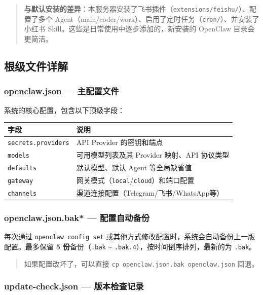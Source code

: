 \begin{quote}
\textbf{与默认安装的差异}：本服务器安装了飞书插件（\texttt{extensions/feishu/}）、配置了多个 Agent（main/coder/work）、启用了定时任务（\texttt{cron/}）、并安装了小红书 Skill。这些是日常使用中逐步添加的，新安装的 OpenClaw 目录会更简洁。
\end{quote}

\subsection{根级文件详解}


\subsubsection{openclaw.json --- 主配置文件}


系统的核心配置，包含以下顶级字段：

\begin{table}[h]
\centering
\small
\begin{tabular}{|l|p{}|}
\hline
字段 & 说明 \\
\hline
\texttt{secrets.providers} & API Provider 的密钥和端点 \\
\hline
\texttt{models} & 可用模型列表及其 Provider 映射、API 协议类型 \\
\hline
\texttt{defaults} & 默认模型、默认 Agent 等全局缺省值 \\
\hline
\texttt{gateway} & 网关模式（\texttt{local}/\texttt{cloud}）和端口配置 \\
\hline
\texttt{channels} & 渠道连接配置（Telegram/飞书/WhatsApp等） \\
\hline
\end{tabular}
\end{table}

\subsubsection{openclaw.json.bak* --- 配置自动备份}


每次通过 \texttt{openclaw config set} 或其他方式修改配置时，系统会自动备份上一版配置。最多保留 \textbf{5 份}备份（\texttt{.bak} \textasciitilde{} \texttt{.bak.4}），按时间倒序排列，最新的为 \texttt{.bak}。

\begin{quote}
如果配置改坏了，可以直接 \texttt{cp openclaw.json.bak openclaw.json} 回退。
\end{quote}

\subsubsection{update-check.json --- 版本检查记录}


